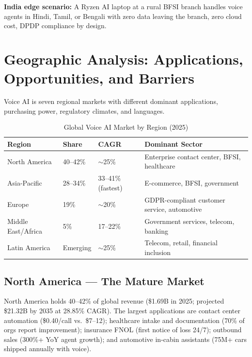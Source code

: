 \documentclass[12pt,a4paper]{article}
\begin{document}
\textbf{India edge scenario:} A Ryzen AI laptop at a rural BFSI branch
handles voice agents in Hindi, Tamil, or Bengali with zero data leaving the
branch, zero cloud cost, DPDP compliance by design.

\section{Geographic Analysis: Applications, Opportunities, and Barriers}
\label{sec:geo}

Voice AI is seven regional markets with different dominant applications,
purchasing power, regulatory climates, and languages.

\begin{table}[H]\centering
\caption{Global Voice AI Market by Region (2025)}
\label{tab:global-snapshot}
\begin{tabularx}{\textwidth}{llll}
\toprule
\textbf{Region} & \textbf{Share} & \textbf{CAGR} & \textbf{Dominant Sector} \\
\midrule
North America  & 40--42\% & $\sim$25\%  & Enterprise contact center, BFSI, healthcare \\
Asia-Pacific   & 28--34\% & 33--41\% (fastest) & E-commerce, BFSI, government \\
Europe         & 19\%     & $\sim$20\% & GDPR-compliant customer service, automotive \\
Middle East/Africa & 5\%  & 17--22\%  & Government services, telecom, banking \\
Latin America  & Emerging & $\sim$25\% & Telecom, retail, financial inclusion \\
\bottomrule
\end{tabularx}
\end{table}

\subsection{North America --- The Mature Market}

North America holds 40--42\% of global revenue (\$1.69B in 2025; projected
\$21.32B by 2035 at 28.85\% CAGR).  The largest applications are contact
center automation (\$0.40/call vs.\ \$7--12); healthcare intake and
documentation (70\% of orgs report improvement); insurance FNOL (first
notice of loss 24/7); outbound sales (300\%+ YoY agent growth); and
automotive in-cabin assistants (75M+ cars shipped annually with voice).
\end{document}
